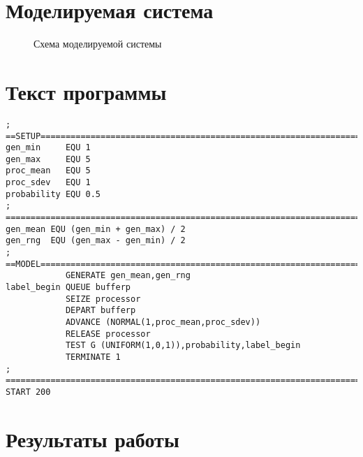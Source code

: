 \section*{Моделируемая система}

\begin{figure}[h]
    \centering
    \def\svgwidth{\textwidth}
    
    \caption{Схема моделируемой системы}
\end{figure}

\clearpage

\section*{Текст программы}
\begin{lstlisting}[caption={Реализация системы}]
; ==SETUP====================================================================
gen_min     EQU 1
gen_max     EQU 5
proc_mean   EQU 5
proc_sdev   EQU 1
probability EQU 0.5
; ===========================================================================
gen_mean EQU (gen_min + gen_max) / 2
gen_rng  EQU (gen_max - gen_min) / 2
; ==MODEL====================================================================
            GENERATE gen_mean,gen_rng
label_begin QUEUE bufferp
            SEIZE processor
            DEPART bufferp
            ADVANCE (NORMAL(1,proc_mean,proc_sdev))
            RELEASE processor
            TEST G (UNIFORM(1,0,1)),probability,label_begin
            TERMINATE 1
; ===========================================================================
START 200
\end{lstlisting}


\section*{Результаты работы}

